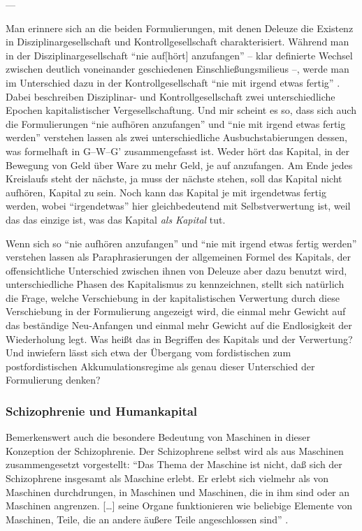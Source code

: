 \documentclass[12pt,
               DIV13,
               paper=a4,
               twoside=false,
               onehalfspacing,
               bibliography=totoc,
               toc=graduated,
               draft,
               ]{scrartcl}
\newcommand{\lips}{\dots\unkern}
\newcommand{\pc}[2]{\parencite[#1]{#2}}
\newcommand{\gwg}{G--W--G'\xspace}
\begin{document}
---

Man erinnere sich an die beiden Formulierungen, mit denen Deleuze die
Existenz in Disziplinargesellschaft und Kontrollgesellschaft
charakterisiert. Während man in der Disziplinargesellschaft "`nie
auf[hört] anzufangen"' \pc{257}{ps} -- klar definierte Wechsel
zwischen deutlich voneinander geschiedenen Einschließungsmilieus --,
werde man im Unterschied dazu in der Kontrollgesellschaft "`nie mit
irgend etwas fertig"' \pc{257}{ps}. Dabei beschreiben Disziplinar- und
Kontrollgesellschaft zwei unterschiedliche Epochen kapitalistischer
Vergesellschaftung. Und mir scheint es so, dass sich auch die
Formulierungen "`nie aufhören anzufangen"' und "`nie mit irgend etwas
fertig werden"' verstehen lassen als zwei unterschiedliche
Ausbuchstabierungen dessen, was formelhaft in \gwg zusammengefasst
ist. Weder hört das Kapital, in der Bewegung von Geld über Ware zu
mehr Geld, je auf anzufangen. Am Ende jedes Kreislaufs steht der
nächste, ja muss der nächste stehen, soll das Kapital nicht aufhören,
Kapital zu sein. Noch kann das Kapital je mit irgendetwas fertig
werden, wobei "`irgendetwas"' hier gleichbedeutend mit
Selbstverwertung ist, weil das das einzige ist, was das Kapital
\emph{als Kapital} tut.

Wenn sich so "`nie aufhören anzufangen"' und "`nie mit irgend etwas
fertig werden"' verstehen lassen als Paraphrasierungen der allgemeinen
Formel des Kapitals, der offensichtliche Unterschied zwischen ihnen
von Deleuze aber dazu benutzt wird, unterschiedliche Phasen des
Kapitalismus zu kennzeichnen, stellt sich natürlich die Frage, welche
Verschiebung in der kapitalistischen Verwertung durch diese
Verschiebung in der Formulierung angezeigt wird, die einmal mehr
Gewicht auf das beständige Neu-Anfangen und einmal mehr Gewicht auf
die Endlosigkeit der Wiederholung legt. Was heißt das in Begriffen des
Kapitals und der Verwertung? Und inwiefern lässt sich etwa der
Übergang vom fordistischen zum postfordistischen Akkumulationsregime
als genau dieser Unterschied der Formulierung denken?

\subsubsection{Schizophrenie und Humankapital}

Bemerkenswert auch die besondere Bedeutung von Maschinen in dieser
Konzeption der Schizophrenie. Der Schizophrene selbst wird als aus
Maschinen zusammengesetzt vorgestellt: "`Das Thema der Maschine ist
nicht, daß sich der Schizophrene insgesamt als Maschine erlebt. Er
erlebt sich vielmehr als von Maschinen durchdrungen, in Maschinen und
Maschinen, die in ihm sind oder an Maschinen angrenzen. [\lips] seine
Organe funktionieren wie beliebige Elemente von Maschinen, Teile, die
an andere äußere Teile angeschlossen sind"' \pc{18}{schizg}.
\end{document}
